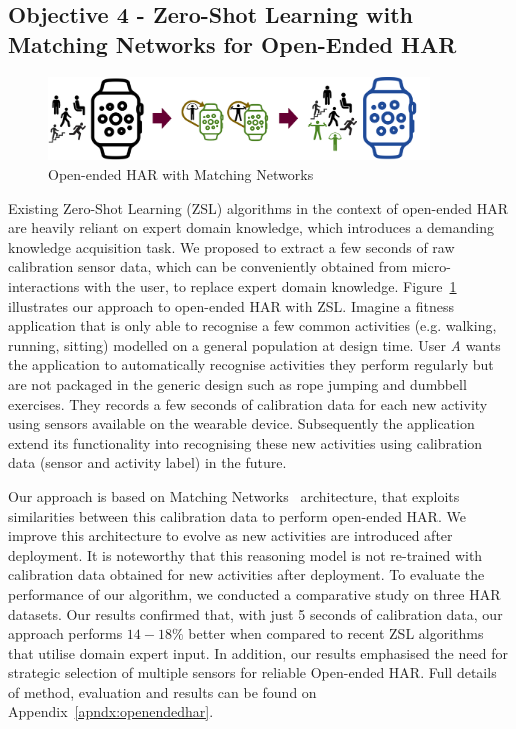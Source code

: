 \documentclass[runningheads]{llncs}
\begin{document}
\subsection{Objective 4 - Zero-Shot Learning with Matching Networks for Open-Ended HAR}
\begin{figure}[ht]
\centering
\includegraphics[width=0.9\textwidth]{oehar.png}
\caption{Open-ended HAR with Matching Networks}
\label {fig:oehar}
\end{figure}
Existing Zero-Shot Learning (ZSL) algorithms in the context of open-ended HAR are heavily reliant on expert domain knowledge, which introduces a demanding knowledge acquisition task. 
We proposed to extract a few seconds of raw calibration sensor data, which can be conveniently obtained from micro-interactions with the user, to replace expert domain knowledge.
Figure~\ref{fig:oehar} illustrates our approach to open-ended HAR with ZSL. 
Imagine a fitness application that is only able to recognise a few common activities (e.g. walking, running, sitting) modelled on a general population at design time.
User \textit{A} wants the application to automatically recognise activities they perform regularly but are not packaged in the generic design such as rope jumping and dumbbell exercises. 
They records a few seconds of calibration data for each new activity using sensors available on the wearable device. Subsequently the application extend its functionality into recognising these new activities using calibration data (sensor and activity label) in the future. 

Our approach is based on Matching Networks~\cite{vinyals2016matching} architecture, that exploits similarities between this calibration data to perform open-ended HAR. We improve this architecture to evolve as new activities are introduced after deployment. It is noteworthy that this reasoning model is not re-trained with calibration data obtained for new activities after deployment. 
To evaluate the performance of our algorithm, we conducted a comparative study on three HAR datasets. 
Our results confirmed that, with just 5 seconds of calibration data, our approach performs $14- 18\%$ better when compared to recent ZSL algorithms that utilise domain expert input. 
In addition, our results emphasised the need for strategic selection of multiple sensors for reliable Open-ended HAR.
Full details of method, evaluation and results can be found on Appendix~\ref{apndx:openendedhar}. 
\clearpage
\end{document}
